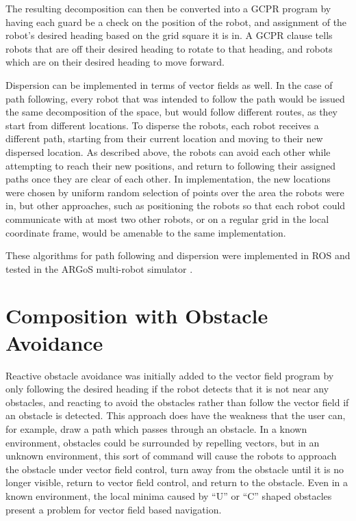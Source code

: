The resulting decomposition can then be converted into a GCPR program by having each guard be a check on the position of the robot, and assignment of the robot's desired heading based on the grid square it is in.
A GCPR clause tells robots that are off their desired heading to rotate to that heading, and robots which are on their desired heading to move forward. 

Dispersion can be implemented in terms of vector fields as well. 
In the case of path following, every robot that was intended to follow the path would be issued the same decomposition of the space, but would follow different routes, as they start from different locations. 
To disperse the robots, each robot receives a different path, starting from their current location and moving to their new dispersed location. 
As described above, the robots can avoid each other while attempting to reach their new positions, and return to following their assigned paths once they are clear of each other. 
In implementation, the new locations were chosen by uniform random selection of points over the area the robots were in, but other approaches, such as positioning the robots so that each robot could communicate with at most two other robots, or on a regular grid in the local coordinate frame, would be amenable to the same implementation. 

These algorithms for path following and dispersion were implemented in ROS and tested in the ARGoS multi-robot simulator \citep{pinciroli2012argos}.

\section{Composition with Obstacle Avoidance} \label{section:Composition_with_Obstacle_Avoidance}

Reactive obstacle avoidance was initially added to the vector field program by only following the desired heading if the robot detects that it is not near any obstacles, and reacting to avoid the obstacles rather than follow the vector field if an obstacle is detected. 
This approach does have the weakness that the user can, for example, draw a path which passes through an obstacle. 
In a known environment, obstacles could be surrounded by repelling vectors, but in an unknown environment, this sort of command will cause the robots to approach the obstacle under vector field control, turn away from the obstacle until it is no longer visible, return to vector field control, and return to the obstacle. 
Even in a known environment, the local minima caused by ``U'' or ``C'' shaped obstacles present a problem for vector field based navigation. 

